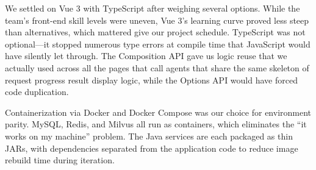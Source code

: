 We settled on Vue 3 with TypeScript after weighing several options. While the team's front-end skill levels were uneven, Vue 3's learning curve proved less steep than alternatives, which mattered give our project schedule. TypeScript was not optional---it stopped numerous type errors at compile time that JavaScript would have silently let through. The Composition API gave us logic reuse that we actually used across all the pages that call agents that share the same skeleton of request \textrightarrow{} progress \textrightarrow{} result display logic, while the Options API would have forced code duplication.

Containerization via Docker and Docker Compose was our choice for environment parity. MySQL, Redis, and Milvus all run as containers, which eliminates the ``it works on my machine'' problem. The Java services are each packaged as thin JARs, with dependencies separated from the application code to reduce image rebuild time during iteration.

\newpage

